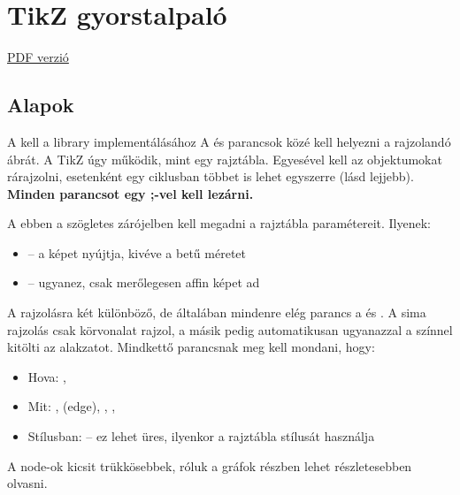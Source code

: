\chapter{TikZ gyorstalpal\'o}

\href{./mainpage.pdf}{PDF verzió}

\section{Alapok}

A \code{\usepackage{tikzpicture}} kell a library implementálásához A \code{\begin{tikzpicture}} és \code{\end{tikzpicture}} parancsok közé kell helyezni a rajzolandó ábrát. A TikZ úgy működik, mint egy rajztábla. Egyesével kell az objektumokat rárajzolni, esetenként egy ciklusban többet is lehet egyszerre (lásd lejjebb). \textbf{Minden parancsot egy  ;-vel kell lezárni.}

A \code{\begin{tikzpicture}["paraméterek"]} ebben a szögletes zárójelben kell megadni a rajztábla paramétereit. Ilyenek:
\begin{itemize}
    \item {}  -- a képet nyújtja, kivéve a betű méretet
    \item {}  -- ugyanez, csak merőlegesen affin képet ad
\end{itemize}

A rajzolásra két különböző, de általában mindenre elég parancs a \code{\draw} és \code{\filldraw} . A sima rajzolás csak körvonalat rajzol, a másik pedig automatikusan ugyanazzal a színnel kitölti az alakzatot. Mindkettő parancsnak meg kell mondani, hogy:

\begin{itemize}
    \item Hova: , 
    \item Mit: , \code{--} (edge), , , 
    \item Stílusban:  -- ez lehet üres, ilyenkor a rajztábla stílusát használja
\end{itemize}

A node-ok kicsit trükkösebbek, róluk a gráfok részben lehet részletesebben olvasni.

